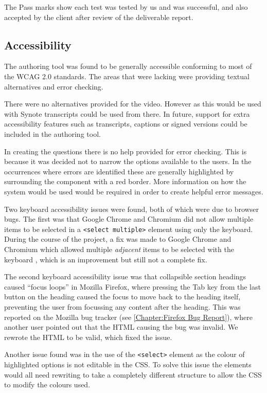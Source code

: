 The Pass marks show each test was tested by us and was successful, and also accepted by the client after review of the deliverable report.

\subsection{Accessibility}
\label{Section:Testing_Authoring_tool_accessibility}

The authoring tool was found to be generally accessible conforming to most of the \gls{WCAG} 2.0 standards. The areas that were lacking were providing textual alternatives and error checking.

There were no alternatives provided for the video. However as this would be used with Synote transcripts could be used from there. In future, support for extra accessibility features such as transcripts, captions or signed versions could be included in the authoring tool.

In creating the questions there is no help provided for error checking. This is because it was decided not to narrow the options available to the users. In the occurrences where errors are identified these are generally highlighted by surrounding the component with a red border. More information on how the system would be used would be required in order to create helpful error messages.

Two keyboard accessibility issues were found, both of which were due to browser bugs. The first was that Google Chrome and Chromium did not allow multiple items to be selected in a \texttt{\textless select multiple\textgreater} element using only the keyboard. During the course of the project, a fix was made to Google Chrome and Chromium which allowed multiple \textit{adjacent} items to be selected with the keyboard \citep{ChromiumMultipleSelectBug}, which is an improvement but still not a complete fix.

The second keyboard accessibility issue was that collapsible section headings caused ``focus loops'' in Mozilla Firefox, where pressing the Tab key from the last button on the heading caused the focus to move back to the heading itself, preventing the user from focussing any content after the heading. This was reported on the Mozilla bug tracker \citep{FirefoxFocusLoopBug} (see \autoref{Chapter:Firefox Bug Report}), where another user pointed out that the HTML causing the bug was invalid. We rewrote the HTML to be valid, which fixed the issue.

Another issue found was in the use of the \texttt{\textless select\textgreater} element as the colour of highlighted options is not editable in the \gls{CSS}. To solve this issue the elements would all need rewriting to take a completely different structure to allow the \gls{CSS} to modify the colours used.

